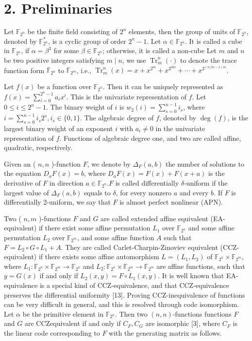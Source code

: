 \documentclass[10pt]{article}
\begin{document}
\section*{2. Preliminaries}
Let $\mathbb{F}_{2^{n}}$ be the finite field consisting of $2^{n}$ elements, then the group of units of $\mathbb{F}_{2^{n}}$, denoted by $\mathbb{F}_{2^{n}}^{*}$, is a cyclic group of order $2^{n}-1$. Let $\alpha \in \mathbb{F}_{2^{n}}$. It is called a cube in $\mathbb{F}_{2^{n}}$, if $\alpha=\beta^{3}$ for some $\beta \in \mathbb{F}_{2^{n}}$; otherwise, it is called a non-cube Let $m$ and $n$ be two positive integers satisfying $m \mid n$, we use $\operatorname{Tr}_{m}^{n}(\cdot)$ to denote the trace function form $\mathbb{F}_{2^{n}}$ to $\mathbb{F}_{2^{m}}$, i.e., $\operatorname{Tr}_{m}^{n}(x)=x+x^{2^{m}}+x^{2^{2 m}}+\cdots+x^{2^{(n / m-1) m}}$.

Let $f(x)$ be a function over $\mathbb{F}_{2^{n}}$. Then it can be uniquely represented as $f(x)=\sum_{i=0}^{2^{n}-1} a_{i} x^{i}$. This is the univariate representation of $f$. Let $0 \leq i \leq 2^{n}-1$. The binary weight of $i$ is $w_{2}(i)=\sum_{s=0}^{n-1} i_{s}$, where $i=\sum_{s=0}^{n-1} i_{s} 2^{s}, i_{s} \in\{0,1\}$. The algebraic degree of $f$, denoted by $\operatorname{deg}(f)$, is the largest binary weight of an exponent $i$ with $a_{i} \neq 0$ in the univariate representation of $f$. Functions of algebraic degree one, and two are called affine, quadratic, respectively.

Given an ( $n, n$ )-function $F$, we denote by $\Delta_{F}(a, b)$ the number of solutions to the equation $D_{a} F(x)=b$, where $D_{a} F(x)=F(x)+F(x+a)$ is the derivative of $F$ in direction $a \in \mathbb{F}_{2^{n}} . F$ is called differentially $\delta$-uniform if the largest value of $\Delta_{F}(a, b)$ equals to $\delta$, for every nonzero $a$ and every $b$. If $F$ is differentially 2-uniform, we say that $F$ is almost perfect nonlinear (APN).

Two ( $n, m$ )-functions $F$ and $G$ are called extended affine equivalent (EA-equivalent) if there exist some affine permutation $L_{1}$ over $\mathbb{F}_{2^{n}}$ and some affine permutation $L_{2}$ over $\mathbb{F}_{2^{m}}$, and some affine function $A$ such that $F=L_{2} \circ G \circ L_{1}+A$. They are called Carlet-Charpin-Zinoviev equivalent (CCZ-equivalent) if there exists some affine automorphism $L=\left(L_{1}, L_{2}\right)$ of $\mathbb{F}_{2^{n}} \times \mathbb{F}_{2^{m}}$, where $L_{1}: \mathbb{F}_{2^{n}} \times \mathbb{F}_{2^{m}} \rightarrow \mathbb{F}_{2^{n}}$ and $L_{2}: \mathbb{F}_{2^{n}} \times \mathbb{F}_{2^{m}} \rightarrow \mathbb{F}_{2^{m}}$ are affine functions, such that $y=G(x)$ if and only if $L_{2}(x, y)=F \circ L_{1}(x, y)$. It is well known that EA-equivalence is a special kind of CCZ-equivalence, and that CCZ-equivalence preserves the differential uniformity [13]. Proving CCZ-inequivalence of functions can be very difficult in general, and this is resolved through code isomorphism. Let $\alpha$ be the primitive element in $\mathbb{F}_{2^{n}}$. Then two $(n, n)$-functions functions $F$ and $G$ are CCZequivalent if and only if $C_{F}, C_{G}$ are isomorphic [3], where $C_{F}$ is the linear code corresponding to $F$ with the generating matrix as follows.
\end{document}

